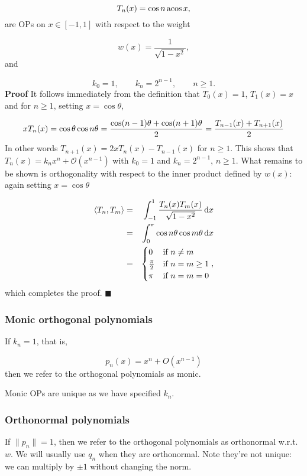 \documentclass[12pt,a4paper]{article}
\begin{document}
\[
T_n(x) = \cos n\,{\rm acos}\, x,
\]
are OPs on $x \in [-1, 1]$ with respect to the weight

\[
w(x) = \frac{1}{\sqrt{1 - x^2}},
\]
and

\[
k_0 = 1, \qquad k_n = 2^{n-1}, \qquad n \geq 1.
\]
\textbf{Proof}  It follows immediately from the definition that $T_0(x) = 1$, $T_{1}(x) = x$ and for $n \geq 1$, setting $x = \cos \theta$,

\[
x T_n(x) = \cos \ensuremath{\theta} \cos n \ensuremath{\theta} = {\cos(n-1)\ensuremath{\theta} + \cos(n+1)\ensuremath{\theta} \over 2} = {T_{n-1}(x) + T_{n+1}(x) \over 2}
\]
In other words $T_{n+1}(x) = 2x T_n(x) - T_{n-1}(x)$ for $n \geq 1$. This shows that $T_n(x) = k_nx^{n} + \mathcal{O}(x^{n-1})$ with $k_0 = 1$ and $k_n = 2^{n-1}$, $n \geq 1$.  What remains to be shown is orthogonality with respect to the inner product defined by $w(x)$: again setting $x = \cos \theta$


\begin{eqnarray*}
\langle T_n, T_m\rangle &=& \int_{-1}^{1}\frac{T_n(x)T_m(x)}{\sqrt{1 - x^2}}\, {\rm d}x \\
  &= & \int_{0}^{\pi} \cos n\theta \cos m\theta \, {\rm d}x \\
  &=& \begin{cases} 
0 & \text{if } n \neq m \\
\frac{\pi}{2} & \text{if } n = m \geq 1 \\
\pi & \text{if } n = m = 0
\end{cases},
\end{eqnarray*}
which completes the proof.  $\blacksquare$

\subsubsection{Monic orthogonal polynomials}
If $k_n = 1$, that is,

\[
p_n(x) = x^n + O(x^{n-1})
\]
then we refer to the orthogonal polynomials as monic.

Monic OPs are unique as we have specified $k_n$.

\subsubsection{Orthonormal polynomials}
If  $\| p_n \| = 1$, then we refer to the orthogonal polynomials as orthonormal w.r.t. $w$. We will usually use $q_n$ when they are orthonormal.   Note they're not unique: we can multiply by $\pm 1$ without changing the norm.
\end{document}
